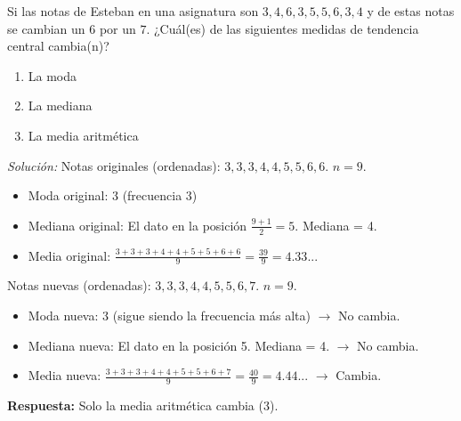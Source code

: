 \documentclass[12pt, letterpaper]{article}
\begin{document}
\noindent %
Si las notas de Esteban en una asignatura son \(3, 4, 6, 3, 5, 5, 6, 3, 4\) y de estas notas se cambian un $6$ por un $7$. ¿Cuál(es) de las siguientes medidas de tendencia central cambia(n)?
\begin{enumerate}
    \item La moda
    \item La mediana
    \item La media aritmética
\end{enumerate}
\textit{Solución:}
Notas originales (ordenadas): \(3, 3, 3, 4, 4, 5, 5, 6, 6\). $n=9$.
\begin{itemize}
    \item Moda original: 3 (frecuencia 3)
    \item Mediana original: El dato en la posición $\frac{9+1}{2}=5$. Mediana = 4.
    \item Media original: $\frac{3+3+3+4+4+5+5+6+6}{9} = \frac{39}{9} = 4.33...$
\end{itemize}
Notas nuevas (ordenadas): \(3, 3, 3, 4, 4, 5, 5, 6, 7\). $n=9$.
\begin{itemize}
    \item Moda nueva: 3 (sigue siendo la frecuencia más alta) $\rightarrow$ No cambia.
    \item Mediana nueva: El dato en la posición 5. Mediana = 4. $\rightarrow$ No cambia.
    \item Media nueva: $\frac{3+3+3+4+4+5+5+6+7}{9} = \frac{40}{9} = 4.44...$ $\rightarrow$ Cambia.
\end{itemize}
\textbf{Respuesta:} Solo la media aritmética cambia (3).
\end{document}
